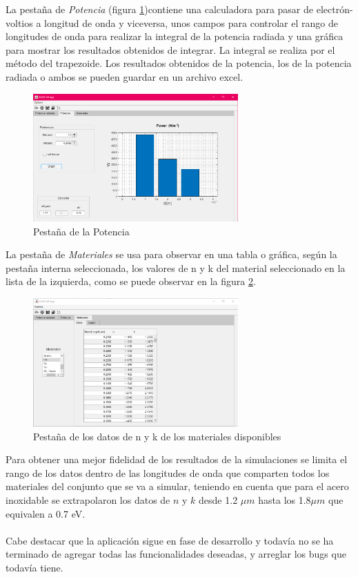 La pestaña de \textit{Potencia} (figura \ref{fig:pestana_Potencia})contiene una calculadora para pasar de electrón-voltios a longitud de onda y viceversa, unos campos para controlar el rango de longitudes de onda para realizar la integral de la potencia radiada y una gráfica para mostrar los resultados obtenidos de integrar. La integral se realiza por el método del trapezoide. Los resultados obtenidos de la potencia, los de la potencia radiada o ambos se pueden guardar en un archivo excel.
\begin{figure}[H]
	\centering
		\includegraphics[width=0.70\textwidth]{figuras/pestana_Potencia.png}
	\caption{Pestaña de la Potencia}
	\label{fig:pestana_Potencia}
\end{figure}
La pestaña de \textit{Materiales} se usa para observar en una tabla o gráfica, según la pestaña interna seleccionada, los valores de n y k del material seleccionado en la lista de la izquierda, como se puede observar en la figura \ref{fig:pestana_materiales}.
\begin{figure}[H]
	\centering
		\includegraphics[width=0.70\textwidth]{figuras/pestana_materiales.png}
	\caption{Pestaña de los datos de n y k  de los materiales disponibles}
	\label{fig:pestana_materiales}
\end{figure}
Para obtener una mejor fidelidad de los resultados de la simulaciones se limita el rango de los datos dentro de las longitudes de onda que comparten todos los materiales del conjunto que se va a simular, teniendo en cuenta que para el acero inoxidable se extrapolaron los datos de $n$ y $k$ desde 1.2 $\mu m$ hasta los 1.8$\mu m$ que equivalen a 0.7 eV.\\\\
Cabe destacar que la aplicación sigue en fase de desarrollo y todavía no se ha terminado de agregar todas las funcionalidades deseadas, y arreglar los bugs que todavía tiene.